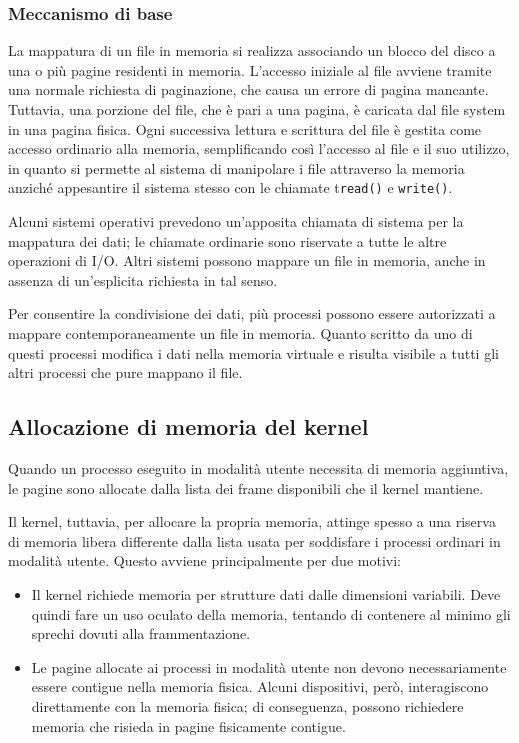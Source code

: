 \documentclass[11pt,a4paper]{article}
\begin{document}
{\subsubsection{Meccanismo di base}
La mappatura di un file in memoria si realizza associando un blocco del disco a una o più
pagine residenti in memoria. L'accesso iniziale al file avviene tramite una normale richiesta
di paginazione, che causa un errore di pagina mancante. Tuttavia, una porzione del file, che
è pari a una pagina, è caricata dal file system in una pagina fisica. Ogni successiva lettura e scrittura del fi­le è gestita come accesso ordinario alla memoria, semplificando così l'accesso al file e il suo utilizzo, in quanto si permette al sistema di manipolare i file attraverso la memoria anziché
appesantire il sistema stesso con le chiamate t\texttt{read()} e \texttt{write()}.

Alcuni sistemi operativi prevedono un'apposita chiamata di sistema per la mappatura
dei dati; le chiamate ordinarie sono riservate a tutte le altre operazioni di I/O. Altri sistemi
possono mappare un file in memoria, anche in assenza di un'esplicita richiesta in tal senso.

Per consentire la condivisione dei dati, più processi possono essere autorizzati a map­pare contemporaneamente un file in memoria. Quanto scritto da uno di questi processi mo­difica i dati nella memoria virtuale e risulta visibile a tutti gli altri processi che pure mappano il file.

\subsection{Allocazione di memoria del kernel}
Quando un processo eseguito in modalità utente necessita di memoria aggiuntiva, le pagine
sono allocate dalla lista dei frame disponibili che il kernel mantiene.

Il kernel, tuttavia, per allocare la propria memoria, attinge spesso a una riserva di me­moria libera differente dalla lista usata per soddisfare i processi ordinari in modalità utente.
Questo avviene principalmente per due motivi:
\begin{itemize}
  \item Il kernel richiede memoria per strutture dati dalle dimensioni variabili. Deve quindi fare un uso oculato della memoria, tentando di contenere al minimo gli sprechi dovuti alla frammentazione.
  \item Le pagine allocate ai processi in modalità utente non devono necessariamente essere contigue nella memoria fisica. Alcuni dispositivi, però, interagiscono direttamente con la memoria fisica; di conse­guenza, possono richiedere memoria che risieda in pagine fisicamente contigue.
\end{itemize}

}
\end{document}
